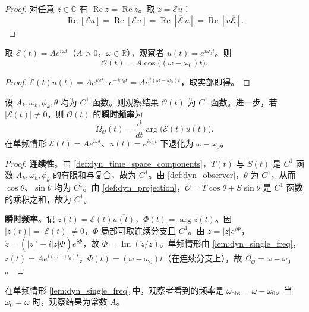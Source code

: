 \begin{proof}
对任意 $z\in\mathbb C$ 有 $\operatorname{Re}z=\operatorname{Re}\overline z$。取 $z=\mathcal E\overline u$：
\[
\operatorname{Re}[\mathcal E\overline u]=\operatorname{Re}\overline{[\mathcal E\overline u]}
=\operatorname{Re}[\overline{\mathcal E}\,u]=\operatorname{Re}[u\overline{\mathcal E}].
\]
\end{proof}

\begin{lemma}[静态退化的单频公式]\label{lem:dyn_single_freq}
取 $\mathcal E(t)=A e^{i\omega t}$（$A>0$，$\omega\in\mathbb R$），观察者 $u(t)=e^{i\omega_0 t}$。则
\[
\mathcal O(t)=A\cos\big((\omega-\omega_0)t\big).
\]
\end{lemma}

\begin{proof}
$\mathcal E(t)\overline{u(t)}=A e^{i\omega t}\cdot e^{-i\omega_0 t}=A e^{i(\omega-\omega_0)t}$，取实部即得。
\end{proof}

\begin{theorem}[动态投影的连续性]\label{thm:dyn_projection_continuity}
设 $A_k,\omega_k,\phi_k,\theta$ 均为 $C^1$ 函数。则观察结果 $\mathcal O(t)$ 为 $C^1$ 函数。进一步，若 $|\mathcal E(t)|\neq 0$，则 $\mathcal O(t)$ 的\textbf{瞬时频率}为
\[
\Omega_{\mathcal O}(t)=\frac{d}{dt}\arg\!\big(\mathcal E(t)\overline{u(t)}\big).
\]
在单频情形 $\mathcal E(t)=A e^{i\omega t}$、$u(t)=e^{i\omega_0 t}$ 下退化为 $\omega-\omega_0$。
\end{theorem}

\begin{proof}
\textbf{连续性}。由 \cref{def:dyn_time_space_components}，$T(t)$ 与 $S(t)$ 是 $C^1$ 函数 $A_k,\omega_k,\phi_k$ 的有限和与复合，故为 $C^1$。由 \cref{def:dyn_observer}，$\theta$ 为 $C^1$，从而 $\cos\theta$、$\sin\theta$ 均为 $C^1$。由 \cref{def:dyn_projection}，$\mathcal O=T\cos\theta+S\sin\theta$ 是 $C^1$ 函数的乘积之和，故为 $C^1$。

\textbf{瞬时频率}。记 $z(t)=\mathcal E(t)\overline{u(t)}$，$\Phi(t)=\arg z(t)$。因 $|z(t)|=|\mathcal E(t)|\neq0$，$\Phi$ 局部可取连续分支且 $C^1$。由 $z=|z|e^{i\Phi}$，$\dot z=(|z|'+i|z|\dot\Phi)e^{i\Phi}$，故 $\dot\Phi=\operatorname{Im}(\dot z/z)$。单频情形由 \cref{lem:dyn_single_freq}，$z(t)=A e^{i(\omega-\omega_0)t}$，$\Phi(t)=(\omega-\omega_0)t$（在连续分支上），故 $\Omega_{\mathcal O}=\omega-\omega_0$。
\end{proof}

\begin{corollary}[旋转参考系下的频率平移]\label{cor:dyn_doppler}
在单频情形 \cref{lem:dyn_single_freq} 中，观察者看到的频率是 $\omega_{\text{obs}}=\omega-\omega_0$。当 $\omega_0=\omega$ 时，观察结果为常数 $A$。
\end{corollary}

